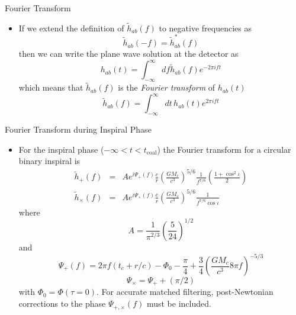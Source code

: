 \documentclass[size=11pt,style=paintings]{powerdot}
\begin{document}
 
 \begin{slide}{Fourier Transform}
 \begin{itemize}
 \item If we extend the definition of $\tilde{h}_{a b}(f)$ to negative frequencies as
 $$
\tilde{h}_{a b}(-f)=\tilde{h}_{a b}^{*}(f)
$$
then we can write the plane wave solution at the detector as
$$
\boxed{h_{a b}(t)=\int_{-\infty}^{\infty} d f \tilde{h}_{a b}(f) e^{-2 \pi i f t}}
$$
which means that $\tilde{h}_{a b}(f)$ is the \textit{Fourier transform} of ${h}_{a b}(t)$
$$
\boxed{\tilde{h}_{a b}(f)=\int_{-\infty}^{\infty} d t \, h_{a b}(t) e^{2 \pi i f t}}
$$
 \end{itemize}
 \end{slide}
 
  \begin{slide}{Fourier Transform during Inspiral Phase}
 \begin{itemize}
 \item For the inspiral phase (\(-\infty<t<t_{\mathrm{coal}}\)) the Fourier transform for a circular binary inspiral is 
\begin{eqnarray} 
\tilde{h}_{+}(f) &=&A e^{i \Psi_{+}(f)} \frac{c}{r}\left(\frac{G M_{c}}{c^{3}}\right)^{5 / 6} \frac{1}{f^{7 / 6}}\left(\frac{1+\cos ^{2} \iota}{2}\right) \\ 
\tilde{h}_{\times}(f) &=& A e^{i \Psi_{\times}(f)} \frac{c}{r}\left(\frac{G M_{c}}{c^{3}}\right)^{5 / 6} \frac{1}{f^{7 / 6} \cos \iota}
\end{eqnarray}
where
\vspace{-0.2cm}
 $$
A=\frac{1}{\pi^{2 / 3}}\left(\frac{5}{24}\right)^{1 / 2}
$$
and
\vspace{-0.4cm}
$$
\Psi_{+}(f)=2 \pi f\left(t_{c}+r / c\right)-\Phi_{0}-\frac{\pi}{4}+\frac{3}{4}\left(\frac{G M_{c}}{c^{3}} 8 \pi f\right)^{-5 / 3}
$$
 $$
\Psi_{\times}=\Psi_{+}+(\pi / 2)
$$
with   $\Phi_0=\Phi(\tau=0)$. For accurate matched filtering, post-Newtonian corrections to the phase $
\Psi_{+, \times}(f)
$ must be included.

 \end{itemize}
 \end{slide}
 
\end{document}

